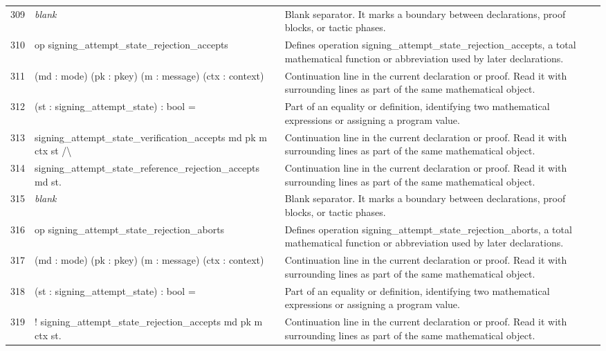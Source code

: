 \documentclass[10pt]{article}
\begin{document}
\begin{longtable}{r L{0.53\textwidth} L{0.37\textwidth}}
309 & {\ttfamily\scriptsize \emph{blank}} & Blank separator.  It marks a boundary between declarations, proof blocks, or tactic phases. \\
310 & {\ttfamily\scriptsize op signing\_attempt\_state\_rejection\_accepts} & Defines operation signing\_attempt\_state\_rejection\_accepts, a total mathematical function or abbreviation used by later declarations. \\
311 & {\ttfamily\scriptsize    (md : mode) (pk : pkey) (m : message) (ctx : context)} & Continuation line in the current declaration or proof.  Read it with surrounding lines as part of the same mathematical object. \\
312 & {\ttfamily\scriptsize    (st : signing\_attempt\_state) : bool =} & Part of an equality or definition, identifying two mathematical expressions or assigning a program value. \\
313 & {\ttfamily\scriptsize   signing\_attempt\_state\_verification\_accepts md pk m ctx st /\textbackslash{}} & Continuation line in the current declaration or proof.  Read it with surrounding lines as part of the same mathematical object. \\
314 & {\ttfamily\scriptsize   signing\_attempt\_state\_reference\_rejection\_accepts md st.} & Continuation line in the current declaration or proof.  Read it with surrounding lines as part of the same mathematical object. \\
315 & {\ttfamily\scriptsize \emph{blank}} & Blank separator.  It marks a boundary between declarations, proof blocks, or tactic phases. \\
316 & {\ttfamily\scriptsize op signing\_attempt\_state\_rejection\_aborts} & Defines operation signing\_attempt\_state\_rejection\_aborts, a total mathematical function or abbreviation used by later declarations. \\
317 & {\ttfamily\scriptsize    (md : mode) (pk : pkey) (m : message) (ctx : context)} & Continuation line in the current declaration or proof.  Read it with surrounding lines as part of the same mathematical object. \\
318 & {\ttfamily\scriptsize    (st : signing\_attempt\_state) : bool =} & Part of an equality or definition, identifying two mathematical expressions or assigning a program value. \\
319 & {\ttfamily\scriptsize   ! signing\_attempt\_state\_rejection\_accepts md pk m ctx st.} & Continuation line in the current declaration or proof.  Read it with surrounding lines as part of the same mathematical object. \\

\end{longtable}
\end{document}
